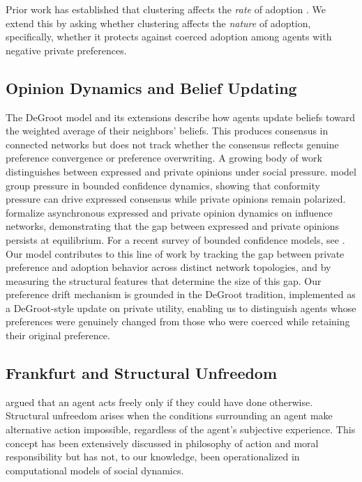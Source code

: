 \documentclass[11pt, a4paper]{article}
\begin{document}
Prior work has established that clustering affects the \textit{rate} of adoption \citep{centola2010spread, miller2009spread}. We extend this by asking whether clustering affects the \textit{nature} of adoption, specifically, whether it protects against coerced adoption among agents with negative private preferences.

\subsection{Opinion Dynamics and Belief Updating}

The DeGroot model \citep{degroot1974reaching} and its extensions \citep{friedkin1990social} describe how agents update beliefs toward the weighted average of their neighbors' beliefs. This produces consensus in connected networks but does not track whether the consensus reflects genuine preference convergence or preference overwriting. A growing body of work distinguishes between expressed and private opinions under social pressure. \citet{cheng2019opinion} model group pressure in bounded confidence dynamics, showing that conformity pressure can drive expressed consensus while private opinions remain polarized. \citet{ye2023expressed} formalize asynchronous expressed and private opinion dynamics on influence networks, demonstrating that the gap between expressed and private opinions persists at equilibrium. For a recent survey of bounded confidence models, see \citet{bernardo2024bounded}. Our model contributes to this line of work by tracking the gap between private preference and adoption behavior across distinct network topologies, and by measuring the structural features that determine the size of this gap. Our preference drift mechanism is grounded in the DeGroot tradition, implemented as a DeGroot-style update on private utility, enabling us to distinguish agents whose preferences were genuinely changed from those who were coerced while retaining their original preference.

\subsection{Frankfurt and Structural Unfreedom}

\citet{frankfurt1971freedom} argued that an agent acts freely only if they could have done otherwise. Structural unfreedom arises when the conditions surrounding an agent make alternative action impossible, regardless of the agent's subjective experience. This concept has been extensively discussed in philosophy of action and moral responsibility \citep{fischer1994metaphysics, mele2006free} but has not, to our knowledge, been operationalized in computational models of social dynamics.
\end{document}
